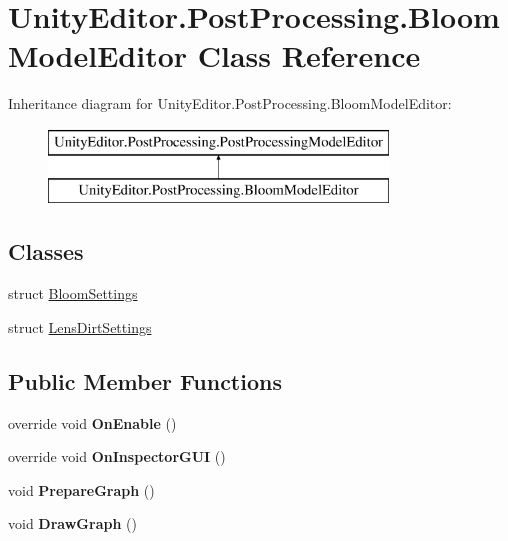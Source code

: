 \hypertarget{class_unity_editor_1_1_post_processing_1_1_bloom_model_editor}{}\section{Unity\+Editor.\+Post\+Processing.\+Bloom\+Model\+Editor Class Reference}
\label{class_unity_editor_1_1_post_processing_1_1_bloom_model_editor}
Inheritance diagram for Unity\+Editor.\+Post\+Processing.\+Bloom\+Model\+Editor\+:\begin{figure}[H]
\begin{center}
\leavevmode
\includegraphics[height=2.000000cm]{class_unity_editor_1_1_post_processing_1_1_bloom_model_editor}
\end{center}
\end{figure}
\subsection*{Classes}
\begin{DoxyCompactItemize}
\item 
struct \hyperlink{struct_unity_editor_1_1_post_processing_1_1_bloom_model_editor_1_1_bloom_settings}{Bloom\+Settings}
\item 
struct \hyperlink{struct_unity_editor_1_1_post_processing_1_1_bloom_model_editor_1_1_lens_dirt_settings}{Lens\+Dirt\+Settings}
\end{DoxyCompactItemize}
\subsection*{Public Member Functions}
\begin{DoxyCompactItemize}
\item 
\mbox{\label{class_unity_editor_1_1_post_processing_1_1_bloom_model_editor_a9e243b49c284dfd0018e7eb8c03b0076}} 
override void {\bfseries On\+Enable} ()
\item 
\mbox{\label{class_unity_editor_1_1_post_processing_1_1_bloom_model_editor_a8ae605305e02f59af174837e93ff5b02}} 
override void {\bfseries On\+Inspector\+G\+UI} ()
\item 
\mbox{\label{class_unity_editor_1_1_post_processing_1_1_bloom_model_editor_aef1c3035ae1a315f947e7a9a142bafd8}} 
void {\bfseries Prepare\+Graph} ()
\item 
\mbox{\label{class_unity_editor_1_1_post_processing_1_1_bloom_model_editor_a53d75ccee84ca82e213efc09700fdffd}} 
void {\bfseries Draw\+Graph} ()
\end{DoxyCompactItemize}
